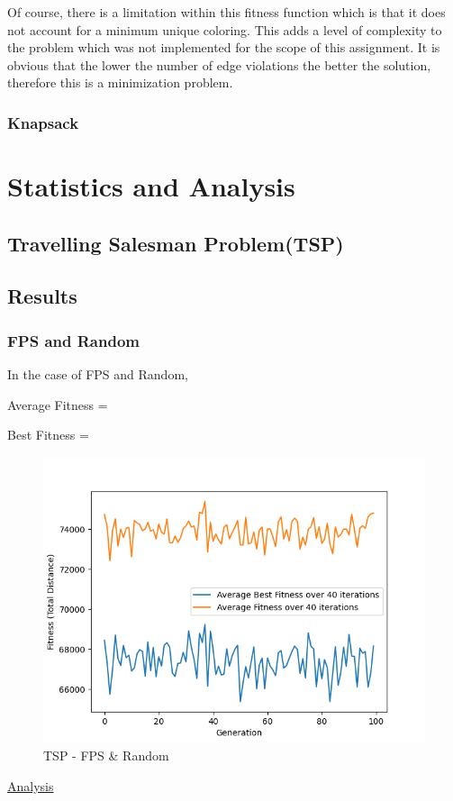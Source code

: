 \documentclass[11pt, letterpaper]{article}
\begin{document}
Of course, there is a limitation within this fitness function which is that it does not account for a minimum unique coloring. This adds a level of complexity to the problem which was not implemented for the scope of this assignment. It is obvious that the lower the number of edge violations the better the solution, therefore this is a minimization problem.
\subsubsection{Knapsack}

\section{Statistics and Analysis}

\subsection{Travelling Salesman Problem(TSP)}

\subsection{Results} 
\subsubsection {FPS and Random}
In the case of FPS and Random,

Average Fitness = 

Best Fitness = 
\begin{figure}[H]
    \centering
    \includegraphics[scale = 0.6]{images/tsp_fp_rd.png}
    \caption {TSP - FPS \& Random}
    \label {fig:tpsFR}
\end{figure}
\underline{Analysis}
\end{document}
